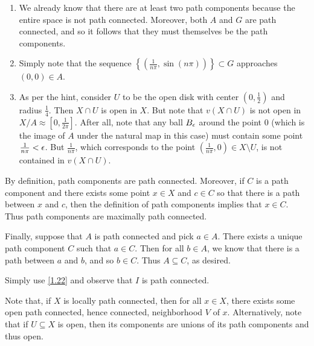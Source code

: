 \documentclass[../../solutions.tex]{subfiles}
\begin{document}
\begin{exercise} \leavevmode
\begin{enumerate}
\item We already know that there are at least two path components because the entire space is not path connected. Moreover, both $A$ and $G$ are path connected, and so it follows that they must themselves be the path components. 

\item Simply note that the sequence $\left\{\left(\frac1{n\pi},\sin(n\pi)\right)\right\}\subset G$ approaches $(0,0)\in A$. 

\item As per the hint, consider $U$ to be the open disk with center $(0,\frac12)$ and radius $\frac14$. Then $X\cap U$ is open in $X$. But note that $v(X\cap U)$ is not open in $X/A\approx[0,\frac1{2\pi}]$. After all, note that any ball $B_\epsilon$ around the point 0 (which is the image of $A$ under the natural map in this case) must contain some point $\frac1{n\pi}<\epsilon$. But $\frac1{n\pi}$, which corresponds to the point $\left(\frac1{n\pi},0\right)\in X\setminus U$, is not contained in $v(X\cap U)$. 
\end{enumerate} 
\end{exercise} 

\begin{exercise} \leavevmode
By definition, path components are path connected. Moreover, if $C$ is a path component and there exists some point $x\in X$ and $c\in C$ so that there is a path between $x$ and $c$, then the definition of path components implies that $x\in C$. Thus path components are maximally path connected. 

Finally, suppose that $A$ is path connected and pick $a\in A$. There exists a unique path component $C$ such that $a\in C$. Then for all $b\in A$, we know that there is a path between $a$ and $b$, and so $b\in C$. Thus $A\subseteq C$, as desired. 
\end{exercise} 

\begin{exercise} \leavevmode
Simply use \cref{1.22} and observe that $I$ is path connected. 
\end{exercise} 

\begin{exercise} \leavevmode
Note that, if $X$ is locally path connected, then for all $x\in X$, there exists some open path connected, hence connected, neighborhood $V$ of $x$. Alternatively, note that if $U\subseteq X$ is open, then its components are unions of its path components and thus open. 
\end{exercise} 
\end{document}
